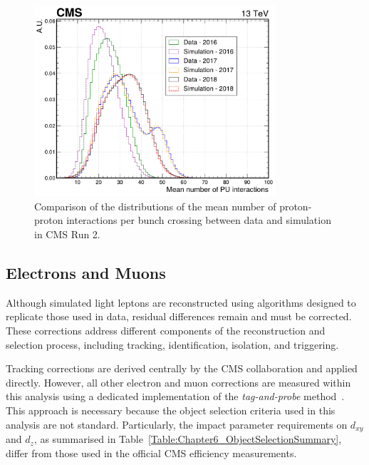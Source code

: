 \begin{figure}[!htbp]
\centering
\includegraphics[width=0.8\textwidth]{Figures/Chapter6/PU_Profile.pdf}
\caption{Comparison of the distributions of the mean number of proton-proton interactions per bunch crossing between data and simulation in CMS Run 2.}
\label{Figure:Chapter6_PU_Profiles}
\end{figure}

\subsection{Electrons and Muons}
\label{Section:Chapter6_LightLepton_Corrections}

Although simulated light leptons are reconstructed using algorithms designed to replicate those used in data, residual differences remain and must be corrected. These corrections address different components of the reconstruction and selection process, including tracking, identification, isolation, and triggering.

Tracking corrections are derived centrally by the \ac{CMS} collaboration and applied directly. However, all other electron and muon corrections are measured within this analysis using a dedicated implementation of the \textit{tag-and-probe} method~\cite{CMS_Muon_System_Performance,CMS_Muon_System_Performance_2}. This approach is necessary because the object selection criteria used in this analysis are not standard. Particularly, the impact parameter requirements on $d_{xy}$ and $d_z$, as summarised in Table~\ref{Table:Chapter6_ObjectSelectionSummary}, differ from those used in the official \ac{CMS} efficiency measurements.

